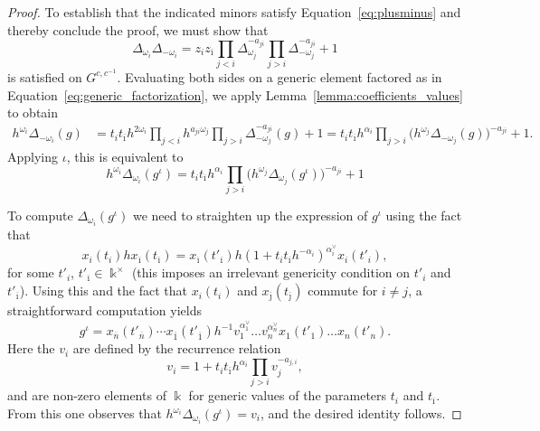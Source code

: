 \documentclass[12pt]{amsart}
\newcommand{\kk}{\Bbbk}
\newcommand{\ol}[1]{\overline{#1}}
\newcommand{\cvar}{z}
\theoremstyle{remark}
\numberwithin{equation}{section}
\numberwithin{figure}{section}
\begin{document}
\begin{proof}
  To establish that the indicated minors satisfy Equation~\ref{eq:plusminus} and thereby conclude the proof, we must show that
  \begin{equation*} 
    \Delta_{\omega_i}\Delta_{-\omega_i} 
    =
    \cvar_i \cvar_{\ol{\imath}}
    \prod_{j<i}\Delta_{\omega_j}^{-a_{ji}}
    \prod_{j>i}\Delta_{-\omega_j}^{-a_{ji}}
    +
    1
  \end{equation*}
  is satisfied on $G^{c,c^{-1}}$.
  Evaluating both sides on a generic element factored as in Equation~\ref{eq:generic_factorization}, we apply Lemma~\ref{lemma:coefficients_values} to obtain
  \begin{align*}
    h^{\omega_i}\Delta_{-\omega_i}(g)
    &=
    t_i
    t_{\ol{\imath}}
    h^{2\omega_i}
    \prod_{j<i}h^{a_{j i}\omega_j}
    \prod_{j>i}\Delta_{-\omega_j}^{-a_{ji}}(g)
    +
    1
    = 
    t_i
    t_{\ol{\imath}}
    h^{\alpha_i}
    \prod_{j>i}\Big(h^{\omega_j}\Delta_{-\omega_j}(g)\Big)^{-a_{ji}}
    +
    1.
  \end{align*}
  Applying $\iota$, this is equivalent to  
  \begin{equation*}
    h^{\omega_i}\Delta_{\omega_i}(g^\iota) =
    t_i
    t_{\ol{\imath}}
    h^{\alpha_i}
    \prod_{j>i}\Big(h^{\omega_j}\Delta_{\omega_j}(g^\iota)\Big)^{-a_{ji}}
    +
    1
  \end{equation*}
  
  To compute $\Delta_{\omega_i}(g^\iota)$ we need to straighten up the expression of $g^\iota$ using the fact that
  \begin{equation*}
    x_i(t_i) h x_{\ol{\imath}}(t_{\ol{\imath}})
    =
    x_{\ol{\imath}}(t'_{\ol{\imath}})
    h
    (1+t_it_{\ol{\imath}}h^{-\alpha_i})^{\alpha_i^\vee}
    x_{i}(t'_i),
  \end{equation*}
  for some $t'_i$, $t'_{\ol{\imath}} \in \kk^\times$ \cite[Proposition 7.2]{BZ01} (this imposes an irrelevant genericity condition on $t'_i$ and $t'_{\ol{\imath}}$).
  Using this and the fact that $x_i(t_i)$ and $x_{\ol{\jmath}}(t_{\ol{\jmath}})$ commute for $i \neq j$, a straightforward computation yields
  \[
    g^\iota 
    = 
    x_{\ol{n}}(t'_{\ol{n}})
    \cdots
    x_{\ol{1}}(t'_{\ol{1}})
    h^{-1}
    v_1^{\alpha^\vee_1}
    \dots
    v_n^{\alpha^\vee_n}
    x_1(t'_1)
    \dots
    x_n(t'_n).
  \]
  Here the $v_i$ are defined by the recurrence relation
  \[
    v_i 
    = 
    1 + t_i t_{\ol{\imath}} h^{\alpha_i}
    \prod_{j > i} v_j^{-a_{j,i}},
  \]
  and are non-zero elements of $\kk$ for generic values of the parameters $t_i$ and $t_{\ol{\imath}}$.
  From this one observes that $h^{\omega_i}\Delta_{\omega_i}(g^\iota) = v_i$, and the desired identity follows.
\end{proof}
\end{document}
